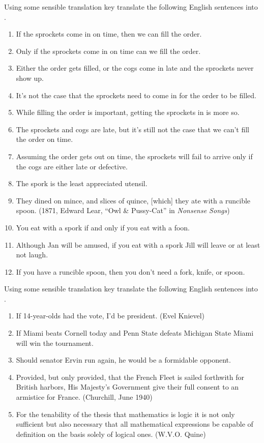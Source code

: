 Using some sensible translation key translate the following English sentences into \GSL{}. 
\begin{enumerate}
	\item If the sprockets come in on time, then we can fill the order.
	\item Only if the sprockets come in on time can we fill the order. 
	\item Either the order gets filled, or the cogs come in late and the sprockets never show up. 
	\item It's not the case that the sprockets need to come in for the order to be filled. 
	\item While filling the order is important, getting the sprockets in is more so. 
	\item The sprockets and cogs are late, but it's still not the case that we can't fill the order on time. 
	\item Assuming the order gets out on time, the sprockets will fail to arrive only if the cogs are either late or defective. 
	\item The spork is the least appreciated utensil. 
	\item They dined on mince, and slices of quince, [which] they ate with a runcible spoon. (1871, Edward Lear, “Owl \& Pussy-Cat” in \emph{Nonsense Songs})
	\item You eat with a spork if and only if you eat with a foon. 
	\item Although Jan will be amused, if you eat with a spork Jill will leave or at least not laugh.
	\item If you have a runcible spoon, then you don't need a fork, knife, or spoon. 
\end{enumerate}

Using some sensible translation key translate the following English sentences into \GSL{}. 
\begin{enumerate}
	\item If 14-year-olds had the vote, I'd be president. (Evel Knievel)
	\item If Miami beats Cornell today and Penn State defeats Michigan State Miami will win the tournament.
	\item Should senator Ervin run again, he would be a formidable opponent. 
	\item Provided, but only provided, that the French Fleet is sailed forthwith for British harbors, His Majesty's Government give their full consent to an armistice for France. (Churchill, June 1940)
	\item For the tenability of the thesis that mathematics is logic it is not only sufficient but also necessary that all mathematical expressions be capable of definition on the basis solely of logical ones. (W.V.O. Quine)
\end{enumerate}


